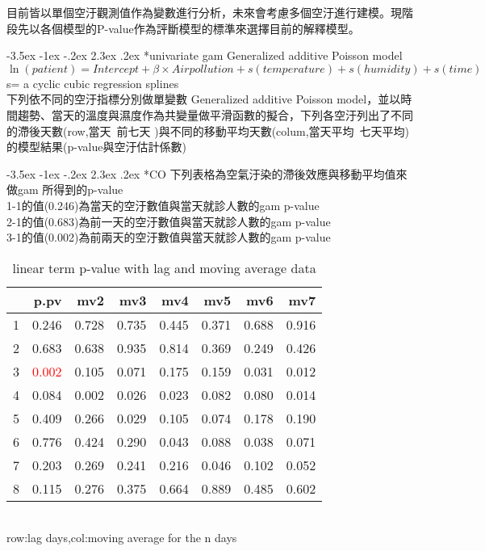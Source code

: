 \documentclass[a4paper, 12pt]{article}
\makeatletter
\def\Large{\fontsize{16}{24}\selectfont}
\def\large{\fontsize{14}{20}\selectfont}
\renewcommand\section{\@startsection {section}{1}{\z@}%
                                   {-3.5ex \@plus -1ex \@minus -.2ex}%
                                   {2.3ex \@plus.2ex}%
                                   {\centering\normalfont\Large\bfseries}}
\renewcommand\subsection{\@startsection {subsection}{1}{\z@}%
                                   {-3.5ex \@plus -1ex \@minus -.2ex}%
                                   {2.3ex \@plus.2ex}%
                                   {\centering\normalfont\large\bfseries}}
\makeatother
\begin{document}
目前皆以單個空汙觀測值作為變數進行分析，未來會考慮多個空汙進行建模。現階段先以各個模型的P-value作為評斷模型的標準來選擇目前的解釋模型。






\section*{univariate gam}
Generalized additive Poisson model
$$
\ln (patient)=Intercept+\beta \times Airpollution+s(temperature)+s(humidity)+s(time)
$$
s= a cyclic cubic regression splines\\
下列依不同的空汙指標分別做單變數 Generalized additive Poisson model，並以時間趨勢、當天的溫度與濕度作為共變量做平滑函數的擬合，下列各空汙列出了不同的滯後天數(row,當天~前七天
)與不同的移動平均天數(colum,當天平均~七天平均)的模型結果(p-value與空汙估計係數)
\clearpage


\subsection*{CO}
下列表格為空氣汙染的滯後效應與移動平均值來做gam 所得到的p-value\\
1-1的值(0.246)為當天的空汙數值與當天就診人數的gam p-value\\
2-1的值(0.683)為前一天的空汙數值與當天就診人數的gam p-value\\
3-1的值(0.002)為前兩天的空汙數值與當天就診人數的gam p-value\\

\begin{table}[h]
\centering
\caption{linear term p-value with lag and moving average data}
\begin{tabular}{rrrrrrrr}
  \hline
 & p.pv & mv2 & mv3 & mv4 & mv5 & mv6 & mv7 \\
  \hline
1 & 0.246 & 0.728 & 0.735 & 0.445 & 0.371 & 0.688 & 0.916 \\
  2 & 0.683 & 0.638 & 0.935 & 0.814 & 0.369 & 0.249 & 0.426 \\
  3 & \textcolor{red}{0.002} & 0.105 & 0.071 & 0.175 & 0.159 & 0.031 & 0.012 \\
  4 & 0.084 & 0.002 & 0.026 & 0.023 & 0.082 & 0.080 & 0.014 \\
  5 & 0.409 & 0.266 & 0.029 & 0.105 & 0.074 & 0.178 & 0.190 \\
  6 & 0.776 & 0.424 & 0.290 & 0.043 & 0.088 & 0.038 & 0.071 \\
  7 & 0.203 & 0.269 & 0.241 & 0.216 & 0.046 & 0.102 & 0.052 \\
  8 & 0.115 & 0.276 & 0.375 & 0.664 & 0.889 & 0.485 & 0.602 \\
   \hline
\end{tabular}
\\row:lag days,col:moving average for the n days
\end{table}
\end{document}
